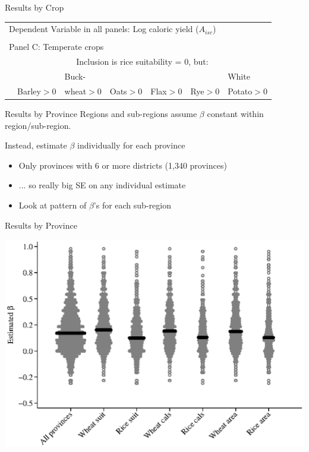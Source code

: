 \documentclass[10pt, xcolor=dvipsnames]{beamer}
\begin{document}
\begin{frame}{Results by Crop}

{\scriptsize
\begin{tabularx}{\textwidth}{lXXXXXX}
\midrule
\multicolumn{7}{l}{Dependent Variable in all panels: Log caloric yield ($A_{isc}$)} \\ \\
\multicolumn{7}{l}{Panel C: Temperate crops} \\
                   & \multicolumn{6}{c}{Inclusion is rice suitability = 0, but:} \\ \cmidrule(lr){2-7}
                   &            & Buck-        &          &          &         & White \\
                   & Barley$>$0 & wheat$>$0  & Oats$>$0 & Flax$>$0 & Rye$>$0 & Potato$>$0   \\
\midrule

\midrule
\end{tabularx}
}

\hfill \hyperlink{crop}{}
\end{frame}


\begin{frame}{Results by Province}\label{prov}
Regions and sub-regions assume $\beta$ constant within region/sub-region. 

\vspace{.2cm}Instead, estimate $\beta$ individually for each province
\begin{itemize}
  \item Only provinces with 6 or more districts (1,340 provinces)
  \item ... so really big SE on any individual estimate
  \item Look at pattern of $\beta$'s for each sub-region
\end{itemize}
\end{frame}

\begin{frame}{Results by Province}
\begin{center}
\includegraphics[width=.8\textwidth]{fig_beta_province.eps}
\end{center}
\end{frame}
\end{document}
